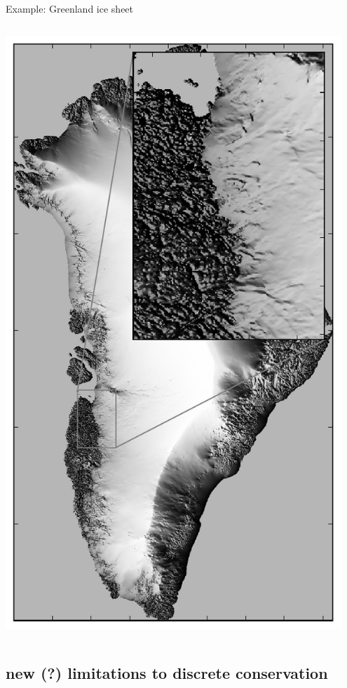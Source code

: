 \documentclass{beamer}
\begin{document}
\begin{frame}{Example: Greenland ice sheet}
\begin{columns}
\begin{column}{0.4\textwidth}
\begin{center}
\includegraphics[width=0.95\textwidth,keepaspectratio=true]{grnwinset}
\end{center}
\end{column}
\end{columns}
\end{frame}


\subsection{new (?) limitations to discrete conservation}
\end{document}

